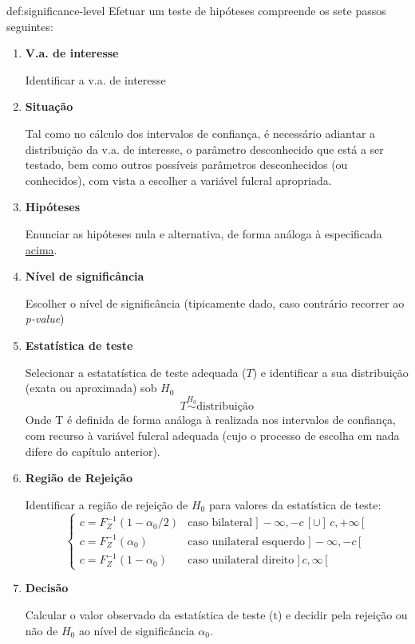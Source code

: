 \begin{theo}{def:significance-level}\label{def:significance-level}
    \noindent Efetuar um teste de hipóteses compreende os sete passos seguintes:
    \begin{enumerate}
        \item \textbf{V.a. de interesse}

        Identificar a v.a. de interesse

        \item \textbf{Situação}

        \noindent Tal como no cálculo dos intervalos de confiança, é necessário adiantar a distribuição da v.a. de interesse, o parâmetro desconhecido que está a ser testado, bem como outros possíveis parâmetros desconhecidos (ou conhecidos), com vista a escolher a variável fulcral apropriada.

        \item \textbf{Hipóteses}

        Enunciar as hipóteses nula e alternativa, de forma análoga à especificada \hyperref[def:null-alter]{acima}.

        \item \textbf{Nível de significância}

        Escolher o nível de significância (tipicamente dado, caso contrário recorrer ao \textit{p-value})

        \item \textbf{Estatística de teste}

        Selecionar a estatatística de teste adequada ($T$) e identificar a sua distribuição (exata ou aproximada) sob $H_0$
        $$
            T \overset{H_0}{\sim} \text{distribuição}
        $$
        Onde T é definida de forma análoga à realizada nos intervalos de confiança, com recurso à variável fulcral adequada (cujo o processo de escolha em nada difere do capítulo anterior).

        \item \textbf{Região de Rejeição}

        Identificar a região de rejeição de $H_0$ para valores da estatística de teste:
        $$
            \left\{\begin{array}{ll}
                 c = F_Z^{-1}(1 - \alpha_0/2) & \text{caso bilateral}\; ]\,-\infty, -c\,[ \cup ]\,c, +\infty\,[\\[4pt]
                 c = F_Z^{-1}(\alpha_0) & \text{caso unilateral esquerdo}\; ]\,-\infty, -c\,[\\[4pt]
                 c = F_Z^{-1}(1 - \alpha_0) & \text{caso unilateral direito}\; ]\,c, \infty\,[
            \end{array}\right.
        $$

        \item \textbf{Decisão}

        Calcular o valor observado da estatística de teste (t) e decidir pela rejeição ou não de $H_0$ ao nível de significância $\alpha_0$.
    \end{enumerate}
\end{theo}

